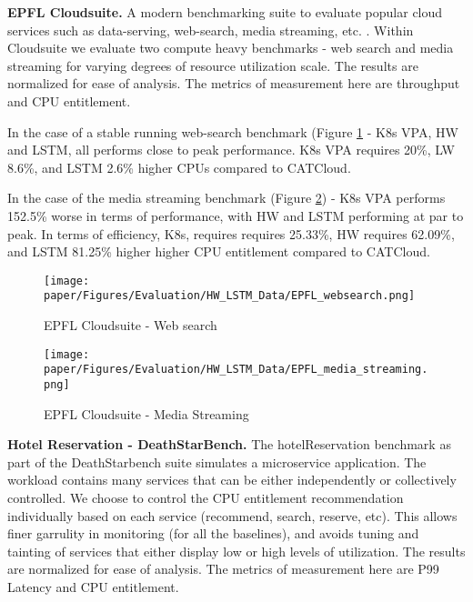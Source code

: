 \textbf{EPFL Cloudsuite.} A modern benchmarking suite to evaluate popular cloud services such as data-serving, web-search, media streaming, etc. \cite{ferdman_clearing_2012}. Within Cloudsuite we evaluate two compute heavy benchmarks - web search and media streaming for varying degrees of resource utilization scale. The results are normalized for ease of analysis. The metrics of measurement here are throughput and CPU entitlement.

In the case of a stable running web-search benchmark (Figure \ref{epfl_web-search} - K8s VPA, HW and LSTM, all performs close to peak performance. K8s VPA requires 20\%, LW 8.6\%, and LSTM 2.6\% higher CPUs compared to CATCloud.

In the case of the media streaming benchmark (Figure \ref{epfl_media}) - K8s VPA performs 152.5\% worse in terms of performance, with HW and LSTM performing at par to peak. In terms of efficiency, K8s, requires requires 25.33\%, HW requires 62.09\%, and LSTM 81.25\% higher higher CPU entitlement compared to CATCloud.

\begin{figure}[h]
  \centering
  \texttt{[image: paper/Figures/Evaluation/HW\_LSTM\_Data/EPFL\_websearch.png]}
  \caption{EPFL Cloudsuite - Web search}\label{epfl_web-search}
  \end{figure}


    \begin{figure}[h]
      \centering
      \texttt{[image: paper/Figures/Evaluation/HW\_LSTM\_Data/EPFL\_media\_streaming.png]}
      \caption{EPFL Cloudsuite - Media Streaming} \label{epfl_media}
      \end{figure}

\textbf{Hotel Reservation - DeathStarBench.} The hotelReservation benchmark as part of the DeathStarbench \cite{gan_open-source_2019} suite simulates a microservice application. The workload contains many services that can be either independently or collectively controlled. We choose to control the CPU entitlement recommendation individually based on each service (recommend, search, reserve, etc). This allows finer garrulity in monitoring (for all the baselines), and avoids tuning and tainting of services that either display low or high levels of utilization. The results are normalized for ease of analysis. The metrics of measurement here are P99 Latency and CPU entitlement.


